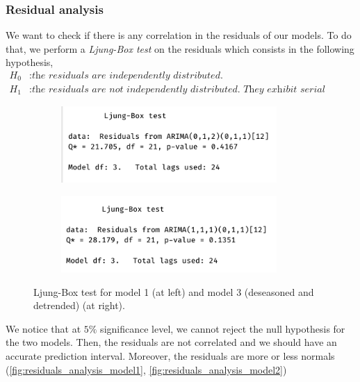 \subsubsection{Residual analysis}

We want to check if there is any correlation in the residuals of our models. To do that, we perform a \textit{Ljung-Box test} on the residuals which consists in the following hypothesis,
\begin{align*}
	H_0&: \textit{the residuals are independently distributed.} \\
	H_1&: \textit{the residuals are not independently distributed. They exhibit serial correlation instead.}
\end{align*}


\begin{figure}[H]
	\centering
	\begin{subfigure}{0.49\textwidth}
		\centering
		\includegraphics[width=0.9\textwidth]{figures/box_jenkins/ljung_box_test_model1.png}
		\label{fig:ljung-box-test-model1}
	\end{subfigure}
	\begin{subfigure}{0.49\textwidth}
		\centering
		\includegraphics[width=0.9\textwidth]{figures/box_jenkins//ljung_box_test_model3.png}
		\label{fig:ljung-box-test-model3}
	\end{subfigure}
	\caption{Ljung-Box test for model 1 (at left) and model 3 (deseasoned and detrended) (at right).}
\end{figure}

We notice that at $5\%$ significance level, we cannot reject the null hypothesis for the two models. Then, the residuals are not correlated and we should have an accurate prediction interval. Moreover, the residuals are more or less normals (\autoref{fig:residuals_analysis_model1}, \autoref{fig:residuals_analysis_model2})

